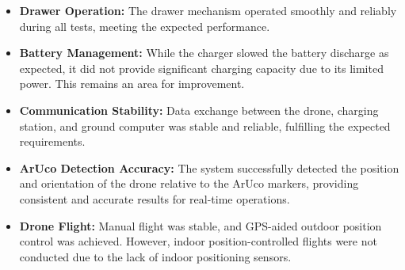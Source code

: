 \begin{itemize}
    \item \textbf{Drawer Operation:} The drawer mechanism operated smoothly and reliably during all tests, meeting the expected performance.
    \item \textbf{Battery Management:} While the charger slowed the battery discharge as expected, it did not provide significant charging capacity due to its limited power. This remains an area for improvement.
    \item \textbf{Communication Stability:} Data exchange between the drone, charging station, and ground computer was stable and reliable, fulfilling the expected requirements.
    \item \textbf{ArUco Detection Accuracy:} The system successfully detected the position and orientation of the drone relative to the ArUco markers, providing consistent and accurate results for real-time operations.
    \item \textbf{Drone Flight:} Manual flight was stable, and GPS-aided outdoor position control was achieved. However, indoor position-controlled flights were not conducted due to the lack of indoor positioning sensors.
\end{itemize}



